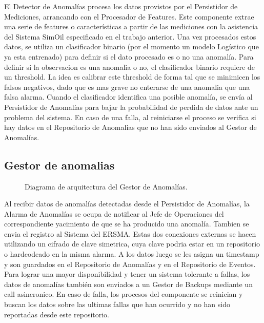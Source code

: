 \documentclass{article}
\theoremstyle{definition}
\theoremstyle{remark}
\begin{document}
El Detector de Anomalías procesa los datos provistos por el Persistidor de Mediciones, arrancando con el Procesador de Features. Este componente extrae una serie de features o características a partir de las mediciones con la asistencia del Sistema SimOil especificado en el trabajo anterior. Una vez procesados estos datos, se utiliza un clasificador binario (por el momento un modelo Logístico que ya esta entrenado) para definir si el dato procesado es o no una anomalía. Para definir si la observacion es una anomalia o no, el clasificador binario requiere de un threshold. La idea es calibrar este threshold de forma tal que se minimicen los falsos negativos, dado que es mas grave no enterarse de una anomalia que una falsa alarma. Cuando el clasificador identifica una posible anomalía, se envía al Persistidor de Anomalías para bajar la probabilidad de perdida de datos ante un problema del sistema. En caso de una falla, al reiniciarse el proceso se verifica si hay datos en el Repositorio de Anomalias que no han sido enviados al Gestor de Anomalías.

\subsection{Gestor de anomalias} \label{gestor_anomalias}

\begin{figure}[H]
  \caption{Diagrama de arquitectura del Gestor de Anomalías.}
\end{figure}

Al recibir datos de anomalías detectadas desde el Persistidor de Anomalías, la Alarma de Anomalías se ocupa de notificar al Jefe de Operaciones del correspondiente yacimiento de que se ha producido una anomalía. Tambien se envia el registro al Sistema del ERSMA. Estas dos conexiones externas se hacen utilizando un cifrado de clave simetrica, cuya clave podria estar en un repositorio o hardcodeado en la misma alarma. A los datos luego se les asigna un timestamp y son guardados en el Repositorio de Anomalías y en el Repositorio de Eventos. Para lograr una mayor disponibilidad y tener un sistema tolerante a fallas, los datos de anomalías también son enviados a un Gestor de Backups mediante un call asincronico. En caso de falla, los procesos del componente se reinician y buscan los datos sobre las ultimas fallas que han ocurrido y no han sido reportadas desde este repositorio.
\end{document}
